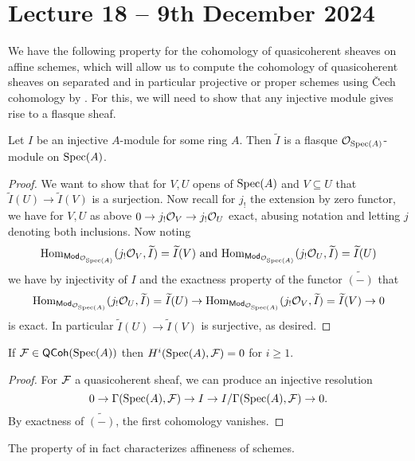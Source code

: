 \section{Lecture 18 -- 9th December 2024}\label{sec: lecture 18}
We have the following property for the cohomology of quasicoherent sheaves on affine schemes, which will allow us to compute the cohomology of quasicoherent sheaves on separated and in particular projective or proper schemes using \v{C}ech cohomology by . For this, we will need to show that any injective module gives rise to a flasque sheaf. 
\begin{lemma}\label{lem: injective implies flasque}
    Let $I$ be an injective $A$-module for some ring $A$. Then $\widetilde{I}$ is a flasque $\mathcal{O}_{\operatorname{Spec}(A)}$-module on $\operatorname{Spec}(A)$. 
\end{lemma}
\begin{proof}
    We want to show that for $V,U$ opens of $\operatorname{Spec}(A)$ and $V\subseteq U$ that $\widetilde{I}(U)\to\widetilde{I}(V)$ is a surjection. Now recall for $j_{!}$ the extension by zero functor, we have for $V,U$ as above $0\to j_{!}\mathcal{O}_{V}\to j_{!}\mathcal{O}_{U}$ exact, abusing notation and letting $j$ denoting both inclusions. Now noting 
    $$\mathrm{Hom}_{\mathsf{Mod}_{\mathcal{O}_{\operatorname{Spec}(A)}}}(j_{!}\mathcal{O}_{V},\widetilde{I})=\widetilde{I}(V)\text{ and }\mathrm{Hom}_{\mathsf{Mod}_{\mathcal{O}_{\operatorname{Spec}(A)}}}(j_{!}\mathcal{O}_{U},\widetilde{I})=\widetilde{I}(U)$$
    we have by injectivity of $I$ and the exactness property of the functor $\widetilde{(-)}$  that 
    $$\mathrm{Hom}_{\mathsf{Mod}_{\mathcal{O}_{\operatorname{Spec}(A)}}}(j_{!}\mathcal{O}_{U},\widetilde{I})=\widetilde{I}(U)\to\mathrm{Hom}_{\mathsf{Mod}_{\mathcal{O}_{\operatorname{Spec}(A)}}}(j_{!}\mathcal{O}_{V},\widetilde{I})=\widetilde{I}(V)\to0$$
    is exact. In particular $\widetilde{I}(U)\to\widetilde{I}(V)$ is surjective, as desired. 
\end{proof}
\begin{proposition}\label{prop: vanishing of higher cohomology on affines}
    If $\mathcal{F}\in\mathsf{QCoh}(\operatorname{Spec}(A))$ then $H^{i}(\operatorname{Spec}(A), \mathcal{F})=0$ for $i\geq 1$. 
\end{proposition}
\begin{proof}
    For $\mathcal{F}$ a quasicoherent sheaf, we can produce an injective resolution 
    $$0\to\Gamma(\operatorname{Spec}(A),\mathcal{F})\to I\to I/\Gamma(\operatorname{Spec}(A),\mathcal{F})\to0.$$
    By exactness of $\widetilde{(-)}$, the first cohomology vanishes. 
\end{proof}
\begin{remark}
    The property of  in fact characterizes affineness of schemes. 
\end{remark}
